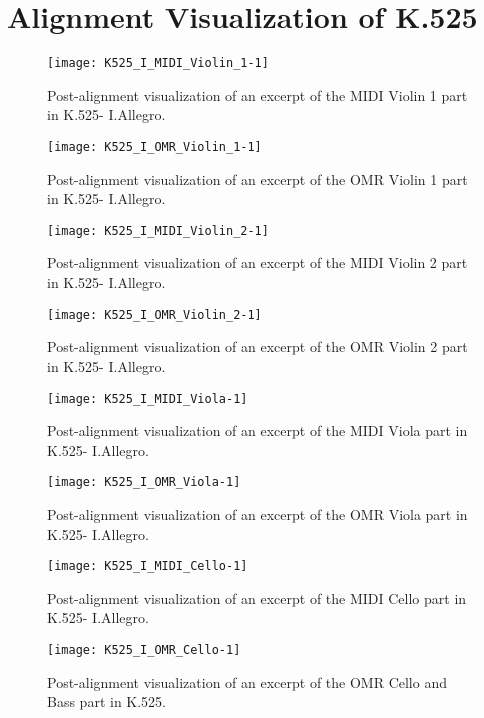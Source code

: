 \chapter{Alignment Visualization of K.525}\label{appb}
\clearpage

\begin{figure}[H]
\centering
\texttt{[image: K525\_I\_MIDI\_Violin\_1-1]}
\caption[K.525- I.Allegro MIDI Violin 1 alignment]{Post-alignment visualization of an excerpt of the MIDI Violin 1 part in K.525- I.Allegro.}
\end{figure}

\begin{figure}[H]
\centering
\texttt{[image: K525\_I\_OMR\_Violin\_1-1]}
\caption[K.525- I.Allegro OMR Violin 1 alignment]{Post-alignment visualization of an excerpt of the OMR Violin 1 part in K.525- I.Allegro.}
\end{figure}

\begin{figure}[H]
\centering
\texttt{[image: K525\_I\_MIDI\_Violin\_2-1]}
\caption[K.525- I.Allegro MIDI Violin 2 alignment]{Post-alignment visualization of an excerpt of the MIDI Violin 2 part in K.525- I.Allegro.}
\end{figure}

\begin{figure}[H]
\centering
\texttt{[image: K525\_I\_OMR\_Violin\_2-1]}
\caption[K.525- I.Allegro OMR Violin 2 alignment]{Post-alignment visualization of an excerpt of the OMR Violin 2 part in K.525- I.Allegro.}
\end{figure}

\begin{figure}[H]
\centering
\texttt{[image: K525\_I\_MIDI\_Viola-1]}
\caption[K.525- I.Allegro MIDI Viola alignment]{Post-alignment visualization of an excerpt of the MIDI Viola part in K.525- I.Allegro.}
\end{figure}

\begin{figure}[H]
\centering
\texttt{[image: K525\_I\_OMR\_Viola-1]}
\caption[K.525- I.Allegro OMR Viola alignment]{Post-alignment visualization of an excerpt of the OMR Viola part in K.525- I.Allegro.}
\end{figure}

\begin{figure}[H]
\centering
\texttt{[image: K525\_I\_MIDI\_Cello-1]}
\caption[K.525- I.Allegro MIDI Cello alignment]{Post-alignment visualization of an excerpt of the MIDI Cello part in K.525- I.Allegro.}
\end{figure}

\begin{figure}[H]
\centering
\texttt{[image: K525\_I\_OMR\_Cello-1]}
\caption[K.525- I.Allegro OMR Cello alignment]{Post-alignment visualization of an excerpt of the OMR Cello and Bass part in K.525.}
\end{figure}


\clearpage
\newpage
